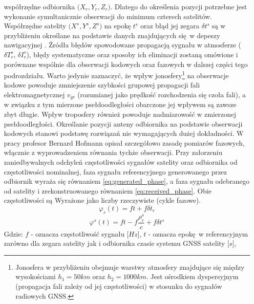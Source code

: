 współrzędne odbiornika $\big(X_r, Y_r, Z_r\big)$. Dlatego do określenia pozycji potrzebne jest wykonanie symultanicznie obserwacji do 
minimum czterech satelitów. Współrzędne satelity $\big(X^s, Y^s, Z^s\big)$ na epokę $t^s$ oraz błąd jej zegara ${\delta}t^s$ są w 
przybliżeniu określane na podstawie danych znajdujących się w depeszy nawigacyjnej \cite[][strona 11]{BOSY_2005}.
Źródła błędów spowodowane propagacją sygnału w atmosferze (${\delta}T_r^s$, ${\delta}I_r^s$), błędy systematyczne oraz sposoby ich eliminacji 
zostaną omówione i porównane wspólnie dla obserwacji kodowych oraz fazowych w dalszej części tego podrozdziału. Warto jedynie zaznaczyć, że wpływ jonosfery\footnote{
Jonosfera w przybliżeniu obejmuje warstwy atmosfery znajdujące się między wysokościami $h_1 = 50km$ oraz $h_2 = 1000km$. Jest ośrodkiem dyspersyjnym (propagacja 
fali zależy od jej częstotliwości) w stosunku do sygnałów radiowych GNSS.} 
na obserwacje kodowe powoduje zmniejszenie szybkości grupowej propagacji fali elektromagnetycznej $v_{gr}$ (rozumianej jako prędkość rozchodzenia się czoła fali), a 
w związku z tym mierzone psełdoodległości obarczone jej wpływem są zawsze zbyt długie. Wpływ troposfery również powoduje nadmiarowość w zmierzonej psełdoodległości.  
Określanie pozycji anteny odbiornika na podstawie obserwacji kodowych stanowi podstawę rozwiązań nie wymagających dużej dokładności.\newline
\indent W pracy \cite[]{hofmann_gnss} profesor Bernard Hofmann opisał szczegółowo zasadę pomiarów fazowych, włącznie z wyprowadzeniem równania tychże obserwacji.
Przy załorzeniu zaniedbywalnych odchyleń częstotliwości sygnałów satelity oraz odbiornika od częstotliwości nominalnej,
faza sygnału referencyjnego generowanego przez odbiornik wyraża się równaniem \ref{eq:generated_phase},
a faza sygnału odebranego od satelity i zrekonstruowanego równaniem \ref{eq:received_phase}. Obie częstotliwości są Wyrażone jako liczby rzeczywiste (cykle fazowe).
\begin{equation}
	{\varphi}_r(t) = ft + f{\delta}t_r
	\label{eq:generated_phase}	
\end{equation}
\begin{equation}
	{\varphi}^s(t) = ft - f\frac{\rho_r^s}{c} + f{\delta}t^s
	\label{eq:received_phase}
\end{equation}
Gdzie: 
$f$ - oznacza częstotliwość sygnału $\big[Hz\big]$,\newline
$t$ - oznacza epokę w referencyjnym zarówno dla zegara satelity jak i odbiornika czasie systemu GNSS satelity $\big[s\big]$,\newline
